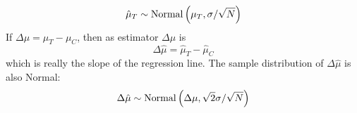 \begin{itemize}
\begin{equation*}
\hat{\mu}_T \sim {\rm Normal}\left(\mu_T,\sigma/\sqrt{N}\right)
\end{equation*}
If  $\Delta \mu = \mu_T-\mu_C$, then as estimator $\Delta \mu$ is 
\begin{equation*}
\Delta \hat{\mu} =  \hat{\mu}_T-\hat{\mu}_C
\end{equation*}
which is really the slope of the regression line. 
The sample distribution of $\Delta \hat{\mu}$ is also Normal:
\begin{equation*}
\Delta \hat{\mu} \sim {\rm Normal}\left(\Delta \mu, \sqrt{2}\sigma/\sqrt{N}\right)
\end{equation*}





\end{itemize}







 



